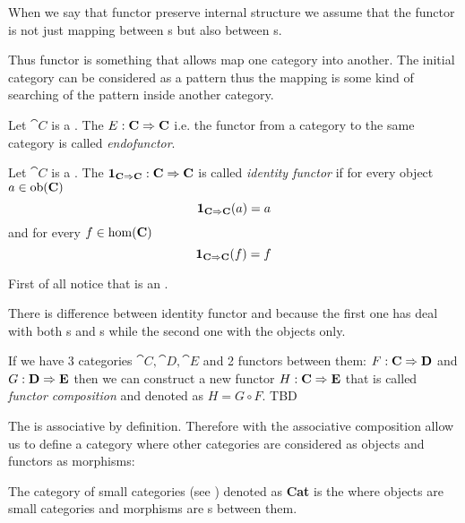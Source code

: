 \begin{remark}[Functor]
When we say that functor preserve internal structure we assume that
the functor is not just mapping between s but
also between s.  

Thus functor is something that allows map one category into another.
The initial category can be considered as a pattern thus the mapping
is some kind of searching of the pattern inside another category.
\end{remark}

\begin{definition}[Endofunctor]
\label{def:endofunctor}
Let $\cat{C}$ is a . The
 $E: \mathbf{C} \Rightarrow \mathbf{C}$ i.e. 
the functor from a category to the same category is called
\textit{endofunctor}. 
\end{definition}

\begin{definition}
\label{def:idfunctor}
Let $\cat{C}$ is a . The
 $\mathbf{1}_{ \mathbf{C} \Rightarrow \mathbf{C} }: \mathbf{C} \Rightarrow \mathbf{C}$ is called \textit{identity
functor} if for every object $a \in \mathrm{ob}(\mathbf{C})$
\[
\mathbf{1}_{ \mathbf{C} \Rightarrow \mathbf{C} }(a) = a
\]
and for every  $f \in \mathrm{hom}(\mathbf{C})$
\[
\mathbf{1}_{ \mathbf{C} \Rightarrow \mathbf{C} }(f) = f
\] 
\end{definition}

\begin{remark}
  \label{rem:idfunctor}
  First of all notice that  is an
  .

  There is difference between identity functor and 
  because the first one has deal with both s and
  s while the second one with the objects
  only. 
\end{remark}

\begin{definition}
\label{def:functor_composition}
If we have 3 categories $\cat{C}, \cat{D}, \cat{E}$ and 2 functors
between them: $F: \mathbf{C} \Rightarrow \mathbf{D}$ and $G: \mathbf{D} \Rightarrow \mathbf{E}$
then we can construct a new functor $H: \mathbf{C} \Rightarrow \mathbf{E}$ that is
called \textit{functor composition} and denoted as $H = G \circ F$.
TBD
\end{definition}

The  is associative by definition.
Therefore  with the associative composition
allow us to define a category where other categories are considered as
objects and functors as morphisms: 
\begin{definition}
\label{def:cat_category}
The category of small categories (see )
denoted as \textbf{Cat} is the  where objects
are small categories and morphisms are s
between them.
\end{definition}


